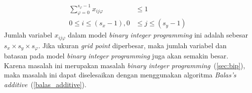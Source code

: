 \begin{equation}
	\begin{split}
		\sum_{\varphi=0}^{s_\varphi-1}x_{ij\varphi}&\leq 1\\
		0\leq i\leq(s_x-1), 0&\leq j\leq(s_y-1)
	\end{split}
\end{equation}
Jumlah variabel \(x_{ij\varphi}\) dalam model \textit{binary integer programming} ini adalah sebesar \(s_x\times s_y\times s_\varphi\). Jika ukuran \textit{grid point} diperbesar, maka jumlah variabel dan batasan pada model \textit{binary integer programming} juga akan semakin besar. Karena masalah ini merupakan masalah \textit{binary integer programming}~(\ref{sec:bip}), maka masalah ini dapat diselesaikan dengan menggunakan algoritma \textit{Balas's additive}~(\ref{balas_additive}).